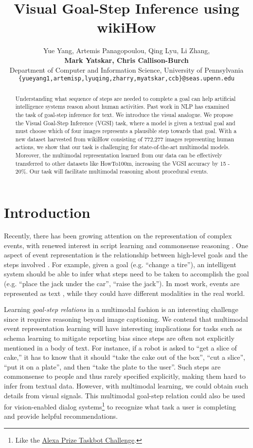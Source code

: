 \documentclass[11pt]{article}
\title{Visual Goal-Step Inference using \textcolor{outerspace}{wiki}\textcolor{OLIVINE}{How}}
\author{Yue Yang,  Artemis Panagopoulou, Qing Lyu, Li Zhang,\\ \textbf{Mark Yatskar, Chris Callison-Burch}\\
Department of Computer and Information Science, University of Pennsylvania\\
{\small{\tt \{yueyang1,artemisp,lyuqing,zharry,myatskar,ccb\}@seas.upenn.edu}}
}
\date{}
\begin{document}
\maketitle
\begin{abstract}
Understanding what sequence of steps are needed to complete a goal can help artificial intelligence systems reason about human activities. Past work in NLP has examined the task of goal-step inference for text. We introduce the visual analogue. We propose the Visual Goal-Step Inference (VGSI) task, where a model is given a textual goal and must choose which of four images represents a plausible step towards that goal. With a new dataset harvested from wikiHow consisting of 772,277 images representing human actions, we show that our task is challenging for state-of-the-art multimodal models. Moreover, the multimodal representation learned from our data can be effectively transferred to other datasets like HowTo100m, increasing the VGSI accuracy by 15 - 20\%. Our task will facilitate multimodal reasoning about procedural events.
\end{abstract}

\section{Introduction}
Recently, there has been growing attention on the representation of complex events, with renewed interest in script learning and commonsense reasoning \cite{park2018learning, mujtaba2019recent, li2020connecting}. One aspect of event representation is the relationship between high-level goals and the steps involved \cite{lyu-zhang-wikihow:2020, zhang-etal-2020-intent}. For example, given a goal (e.g. ``change a tire''), an intelligent system should be able to infer what steps need to be taken to accomplish the goal (e.g. ``place the jack under the car'', ``raise the jack''). 
In most work, events are represented as text \cite{zellers2018swagaf, coucke2018snips, zhang-etal-2019-joint}, while they could have different modalities in the real world.

Learning \textit{goal-step relations} in a multimodal fashion is an interesting challenge since it requires reasoning beyond image captioning. We contend that multimodal event representation learning will have interesting implications for tasks such as schema learning \cite{li2020connecting, li2021future} to mitigate reporting bias \cite{gordon2013reporting} since steps are often not explicitly mentioned in a body of text. For instance, if a robot is asked to ``get a slice of cake,''  it has to know that it should ``take the cake out of the box'', ``cut a slice'', ``put it on a plate'', and then ``take the plate to the user''. Such steps are commonsense to people and thus rarely specified explicitly, making them hard to infer from textual data. However, with multimodal learning, we could obtain such details from visual signals. This multimodal goal-step relation could also be used for vision-enabled dialog systems\footnote{Like the \href{https://www.amazon.science/academic-engagements/amazon-launches-new-alexa-prize-taskbot-challenge}{Alexa Prize Taskbot Challenge}.} to recognize what task a user is completing and provide helpful recommendations. 
\end{document}
